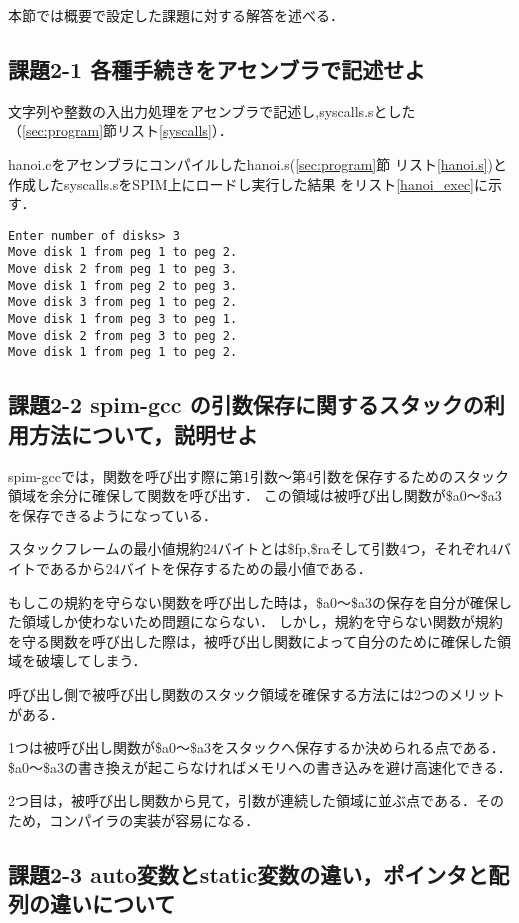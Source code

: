 \documentclass[11pt]{jarticle}
\begin{document}
本節では概要で設定した課題に対する解答を述べる．

\subsection{課題2-1 各種手続きをアセンブラで記述せよ}

文字列や整数の入出力処理をアセンブラで記述し,syscalls.sとした
（\ref{sec:program}節リスト\ref{syscalls}）．

hanoi.cをアセンブラにコンパイルしたhanoi.s(\ref{sec:program}節
リスト\ref{hanoi.s})と作成したsyscalls.sをSPIM上にロードし実行した結果
をリスト\ref{hanoi_exec}に示す．

\begin{lstlisting}[caption=実行結果,label=hanoi_exec]
Enter number of disks> 3
Move disk 1 from peg 1 to peg 2.
Move disk 2 from peg 1 to peg 3.
Move disk 1 from peg 2 to peg 3.
Move disk 3 from peg 1 to peg 2.
Move disk 1 from peg 3 to peg 1.
Move disk 2 from peg 3 to peg 2.
Move disk 1 from peg 1 to peg 2.
\end{lstlisting}

\subsection{課題2-2 spim-gcc の引数保存に関するスタックの利用方法について，説明せよ}

spim-gccでは，関数を呼び出す際に第1引数～第4引数を保存するためのスタック領域を余分に確保して関数を呼び出す．
この領域は被呼び出し関数が\$a0～\$a3を保存できるようになっている．

スタックフレームの最小値規約24バイトとは\$fp,\$raそして引数4つ，それぞれ4バイトであるから24バイトを保存するための最小値である．

もしこの規約を守らない関数を呼び出した時は，\$a0～\$a3の保存を自分が確保した領域しか使わないため問題にならない．
しかし，規約を守らない関数が規約を守る関数を呼び出した際は，被呼び出し関数によって自分のために確保した領域を破壊してしまう．

呼び出し側で被呼び出し関数のスタック領域を確保する方法には2つのメリットがある．

1つは被呼び出し関数が\$a0～\$a3をスタックへ保存するか決められる点である．
\$a0～\$a3の書き換えが起こらなければメモリへの書き込みを避け高速化できる．

2つ目は，被呼び出し関数から見て，引数が連続した領域に並ぶ点である．そのため，コンパイラの実装が容易になる．

\subsection{課題2-3 auto変数とstatic変数の違い，ポインタと配列の違いについて}
\end{document}
